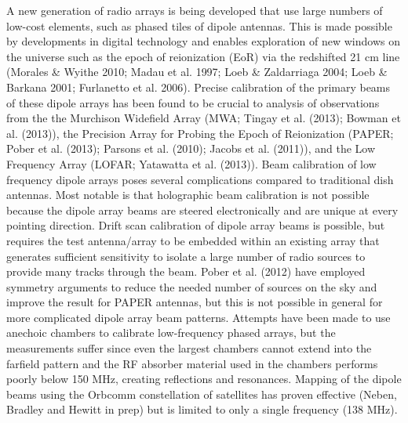 \documentclass[draft,ras]{AGUJournal}
\begin{document}
A new generation of radio arrays is being developed that use large numbers of low-cost elements, such as phased tiles of dipole antennas. This is made possible by developments in digital technology and enables exploration of new windows on the universe such as the epoch of reionization (EoR) via the redshifted 21 cm line (Morales \& Wyithe 2010; Madau et al. 1997; Loeb \& Zaldarriaga 2004; Loeb \& Barkana 2001; Furlanetto et al. 2006). Precise calibration of the primary beams of these dipole arrays has been found to be crucial to analysis of observations from the the Murchison Widefield Array (MWA; Tingay et al. (2013); Bowman et al. (2013)), the Precision Array for Probing the Epoch of Reionization (PAPER; Pober et al. (2013); Parsons et al. (2010); Jacobs et al. (2011)), and the Low Frequency Array (LOFAR; Yatawatta et al. (2013)). Beam calibration of low frequency dipole arrays poses several complications compared to traditional dish antennas. Most notable is that holographic beam calibration is not possible because the dipole array beams are steered electronically and are unique at every pointing direction. Drift scan calibration of dipole array beams is possible, but requires the test antenna/array to be embedded within an existing array that generates sufficient sensitivity to isolate a large number of radio sources to provide many tracks through the beam. Pober et al. (2012) have employed symmetry arguments to reduce the needed number of sources on the sky and improve the result for PAPER antennas, but this is not possible in general for more complicated dipole array beam patterns. Attempts have been made to use anechoic chambers to calibrate low-frequency phased arrays, but the measurements suffer since even the largest chambers cannot extend into the farfield pattern and the RF absorber material used in the chambers performs poorly below 150 MHz, creating reflections and resonances. Mapping of the dipole beams using the Orbcomm constellation of satellites has proven effective (Neben, Bradley and Hewitt in prep) but is limited to only a single frequency (138 MHz).

\end{document}
